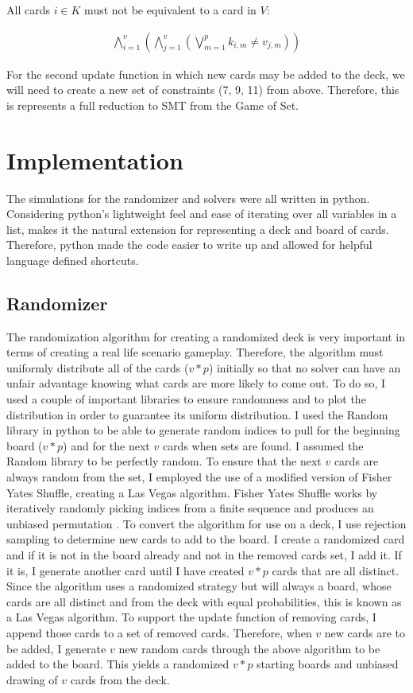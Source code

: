 \documentclass[pageno]{jpaper}
\begin{document}
All cards $i \in K$ must not be equivalent to a card in $V$:

\begin{align}
	\bigwedge \limits_{i=1}^{v}   \left( \bigwedge \limits_{j=1}^{v}  \left( \bigvee \limits_{m = 1}^{p} k_{i,m} \neq v_{j,m} \right)   \right)
\end{align}




For the second update function in which new cards may be added to the deck, we will need to create a new set of constraints (7, 9, 11) from above. Therefore, this is represents a full reduction to SMT from the Game of Set. 


\section{Implementation}

The simulations for the randomizer and solvers were all written in python. Considering python's lightweight feel and ease of iterating over all variables in a list, makes it the natural extension for representing a deck and board of cards. Therefore, python made the code easier to write up and allowed for helpful language defined shortcuts. 


\subsection{Randomizer}

The randomization algorithm for creating a randomized deck is very important in terms of creating a real life scenario gameplay. Therefore, the algorithm must uniformly distribute all of the cards ($v*p$) initially so that no solver can have an unfair advantage knowing what cards are more likely to come out. To do so, I used a couple of important libraries to ensure randomness and to plot the distribution in order to guarantee its uniform distribution. I used the Random library in python to be able to generate random indices to pull for the beginning board ($v*p$) and for the next $v$ cards when sets are found. I assumed the Random library to be perfectly random. To ensure that the next $v$ cards are always random from the set, I employed the use of a modified version of Fisher Yates Shuffle, creating a Las Vegas algorithm. Fisher Yates Shuffle works by iteratively randomly picking indices from a finite sequence and produces an unbiased permutation \cite{fisher}. To convert the algorithm for use on a deck, I use rejection sampling to determine new cards to add to the board. I create a randomized card and if it is not in the board already and not in the removed cards set, I add it. If it is, I generate another card until I have created $v*p$ cards that are all distinct. Since the algorithm uses a randomized strategy but will always a board, whose cards are all distinct and from the deck with equal probabilities, this is known as a Las Vegas algorithm. To support the update function of removing cards, I append those cards to a set of removed cards. Therefore, when $v$ new cards are to be added, I generate $v$ new random cards through the above algorithm to be added to the board. This yields a randomized $v*p$ starting boards and unbiased drawing of $v$ cards from the deck.
\end{document}

